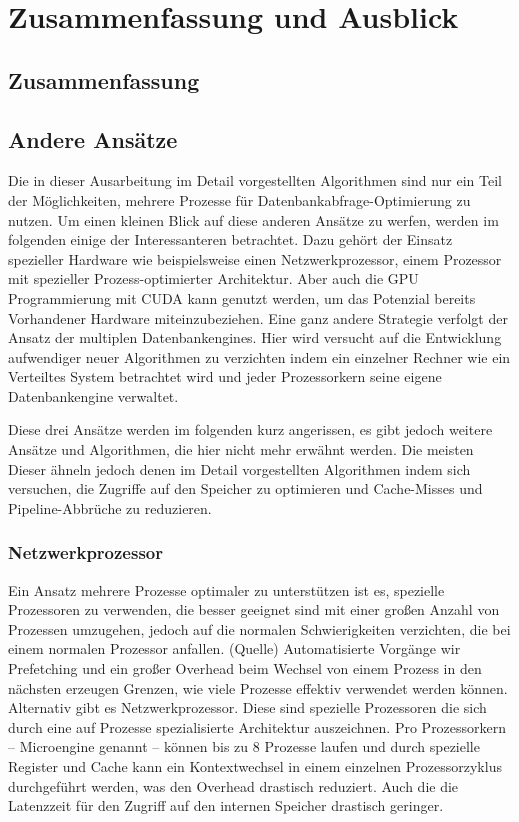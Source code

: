 \chapter{Zusammenfassung und Ausblick}
\label{sec:Zusammenfassung-Ausblick}

\section{Zusammenfassung}
\label{sec:Zusammenfassung}

\section{Andere Ansätze}
\label{sec:AndereAnsatze}
Die in dieser Ausarbeitung im Detail vorgestellten Algorithmen sind nur ein Teil der Möglichkeiten, mehrere Prozesse für Datenbankabfrage-Optimierung zu nutzen. Um einen kleinen Blick auf diese anderen Ansätze zu werfen, werden im folgenden einige der Interessanteren betrachtet. Dazu gehört der Einsatz spezieller Hardware wie beispielsweise einen Netzwerkprozessor, einem Prozessor mit spezieller Prozess-optimierter Architektur. Aber auch die GPU Programmierung mit CUDA kann genutzt werden, um das Potenzial bereits Vorhandener Hardware miteinzubeziehen. Eine ganz andere Strategie verfolgt der Ansatz der multiplen Datenbankengines. Hier wird versucht auf die Entwicklung aufwendiger neuer Algorithmen zu verzichten indem ein einzelner Rechner wie ein Verteiltes System betrachtet wird und jeder Prozessorkern seine eigene Datenbankengine verwaltet.

Diese drei Ansätze werden im folgenden kurz angerissen, es gibt jedoch weitere Ansätze und Algorithmen, die hier nicht mehr erwähnt werden. Die meisten Dieser ähneln jedoch denen im Detail vorgestellten Algorithmen indem sich versuchen, die Zugriffe auf den Speicher zu optimieren und Cache-Misses und Pipeline-Abbrüche zu reduzieren.

\subsection{Netzwerkprozessor}
\label{sec:Netzwerkprozessor}

Ein Ansatz mehrere Prozesse optimaler zu unterstützen ist es, spezielle Prozessoren zu verwenden, die besser geeignet sind mit einer großen Anzahl von Prozessen umzugehen, jedoch auf die normalen Schwierigkeiten verzichten, die bei einem normalen Prozessor anfallen. (Quelle) Automatisierte Vorgänge wir Prefetching und ein großer Overhead beim Wechsel von einem Prozess in den nächsten erzeugen Grenzen, wie viele Prozesse effektiv verwendet werden können. Alternativ gibt es Netzwerkprozessor. Diese sind spezielle Prozessoren die sich durch eine auf Prozesse spezialisierte Architektur auszeichnen. Pro Prozessorkern – Microengine genannt – können bis zu 8 Prozesse laufen und durch spezielle Register und Cache kann ein Kontextwechsel in einem einzelnen Prozessorzyklus durchgeführt werden, was den Overhead drastisch reduziert. Auch die die Latenzzeit für den Zugriff auf den internen Speicher drastisch geringer.

